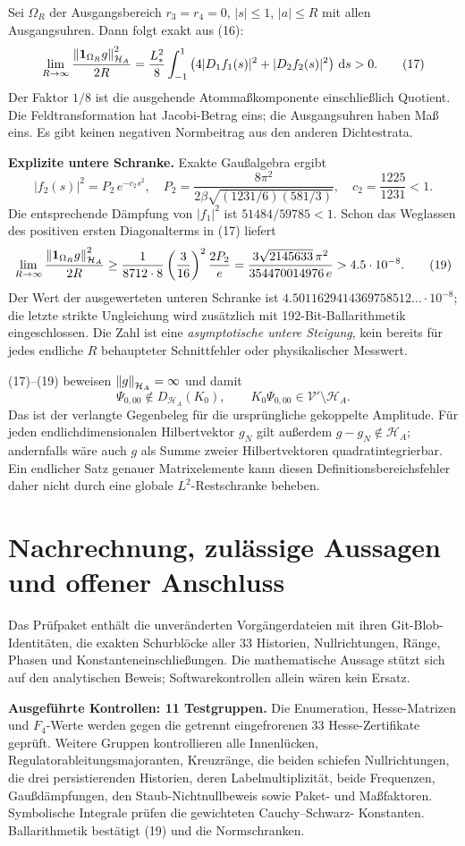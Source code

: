 \documentclass[10pt,a4paper]{article}
\newcommand{\HH}{\mathcal H_A}\newcommand{\VV}{\mathcal V}
\newcommand{\dd}{\,\mathrm d}\newcommand{\ii}{\mathrm i}
\newcommand{\one}{\mathbf1}\newcommand{\Ccal}{\mathcal C_{33}}
\begin{document}
Sei $\Omega_R$ der Ausgangsbereich $r_3=r_4=0$, $|s|\le1$, $|a|\le R$
mit allen Ausgangsuhren. Dann folgt exakt aus (16):
\[
 \lim_{R\to\infty}\frac{\norm{\one_{\Omega_R}g}_{\HH}^2}{2R}
 =\frac{L_*^2}{8}\int_{-1}^{1}
       \left(4|D_1f_1(s)|^2+|D_2f_2(s)|^2\right)\dd s>0. \tag{17}
\]
Der Faktor $1/8$ ist die ausgehende Atommaßkomponente einschließlich Quotient.
Die Feldtransformation hat Jacobi-Betrag eins; die Ausgangsuhren haben Maß eins.
Es gibt keinen negativen Normbeitrag aus den anderen Dichtestrata.

\textbf{Explizite untere Schranke.} Exakte Gaußalgebra ergibt
\[
 |f_2(s)|^2=P_2\,e^{-c_2s^2},\quad
 P_2=\frac{8\pi^2}{2\beta\sqrt{(1231/6)(581/3)}},\quad
 c_2=\frac{1225}{1231}<1. \tag{18}
\]
Die entsprechende Dämpfung von $|f_1|^2$ ist $51484/59785<1$.
Schon das Weglassen des positiven ersten Diagonalterms in (17) liefert
\[
 \lim_{R\to\infty}\frac{\norm{\one_{\Omega_R}g}_{\HH}^2}{2R}
 \ge\frac1{8712\cdot8}\left(\frac3{16}\right)^2\frac{2P_2}{e}
 =\frac{3\sqrt{2145633}\,\pi^2}{354470014976\,e}
 >4.5\cdot10^{-8}. \tag{19}
\]
Der Wert der ausgewerteten unteren Schranke ist
$4.5011629414369758512\ldots\cdot10^{-8}$; die letzte strikte Ungleichung
wird zusätzlich mit 192-Bit-Ballarithmetik eingeschlossen.
Die Zahl ist eine \emph{asymptotische untere Steigung}, kein bereits für jedes
endliche $R$ behaupteter Schnittfehler oder physikalischer Messwert.

(17)--(19) beweisen $\norm g_{\HH}=\infty$ und damit
\[
 \boxed{\Psi_{0,00}\notin D_{\HH}(K_0),\qquad K_0\Psi_{0,00}\in\VV'\setminus\HH.}
\]
Das ist der verlangte Gegenbeleg für die ursprüngliche gekoppelte Amplitude.
Für jeden endlichdimensionalen Hilbertvektor $g_N$ gilt außerdem
$g-g_N\notin\HH$; andernfalls wäre auch $g$ als Summe zweier Hilbertvektoren
quadratintegrierbar. Ein endlicher Satz genauer Matrixelemente kann diesen
Definitionsbereichsfehler daher nicht durch eine globale $L^2$-Restschranke beheben.
\newpage

\section{Nachrechnung, zulässige Aussagen und offener Anschluss}
Das Prüfpaket enthält die unveränderten Vorgängerdateien mit ihren Git-Blob-
Identitäten, die exakten Schurblöcke aller 33 Historien, Nullrichtungen,
Ränge, Phasen und Konstanteneinschließungen. Die mathematische Aussage stützt
sich auf den analytischen Beweis; Softwarekontrollen allein wären kein Ersatz.

\textbf{Ausgeführte Kontrollen: 11 Testgruppen.}
Die Enumeration, Hesse-Matrizen und $F_4$-Werte werden gegen die getrennt
eingefrorenen 33 Hesse-Zertifikate geprüft. Weitere Gruppen kontrollieren alle
Innenlücken, Regulatorableitungsmajoranten, Kreuzränge, die beiden schiefen
Nullrichtungen, die drei persistierenden Historien, deren Labelmultiplizität,
beide Frequenzen, Gaußdämpfungen, den Staub-Nichtnullbeweis sowie Paket- und
Maßfaktoren. Symbolische Integrale prüfen die gewichteten Cauchy--Schwarz-
Konstanten. Ballarithmetik bestätigt (19) und die Normschranken.
\end{document}
